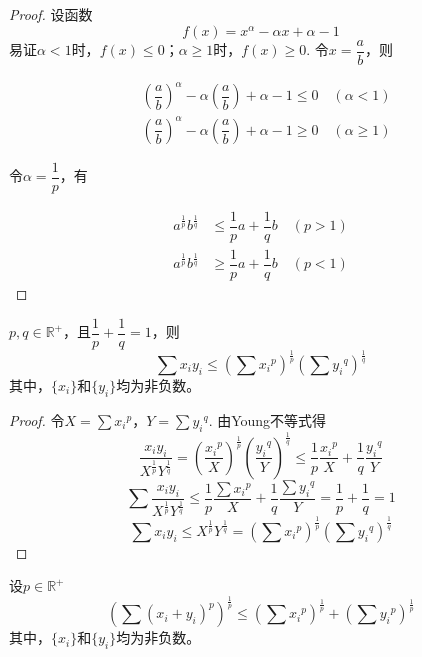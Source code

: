 \begin{proof}

    设函数
    $$f(x) = x^{\alpha} - \alpha x + \alpha - 1$$
    易证$\alpha < 1 $时，$f(x) \leq 0$；$\alpha \geq 1$时，$f(x) \geq 0$.
    令$x=\dfrac{a}{b}$，则
    
    \begin{align*}
        &\left( \dfrac{a}{b} \right)^{\alpha} - \alpha \left( \dfrac{a}{b} \right) + \alpha - 1 \leq 0 \quad (\alpha < 1)\\
        &\left( \dfrac{a}{b} \right)^{\alpha} - \alpha \left( \dfrac{a}{b} \right) + \alpha - 1 \geq 0 \quad (\alpha \geq 1)
    \end{align*}

    令$\alpha = \dfrac{1}{p}$，有

    \begin{align*}
        a^{\frac{1}{p}}b^{\frac{1}{q}}&\leq\dfrac{1}{p}a+\dfrac{1}{q}b\quad(p>1)\\
        a^{\frac{1}{p}}b^{\frac{1}{q}}&\geq\dfrac{1}{p}a+\dfrac{1}{q}b\quad(p<1)
    \end{align*}

\end{proof}

\begin{theorem}[H{\H o}lder不等式]
    
    $p,q\in\mathbb{R}^+$，且$\dfrac{1}{p}+\dfrac{1}{q}=1$，则
    $$\sum{x_i y_i} \leq \left(\sum{{x_i}^{p}}\right)^{\frac{1}{p}} \left(\sum{{y_i}^{q}}\right)^{\frac{1}{q}}$$
    其中，$\{x_i\}$和$\{y_i\}$均为非负数。

\end{theorem}

\begin{proof}

    令$X=\sum{{x_i}^p}$，$Y=\sum{{y_i}^q}$.
    由\textup{Young}不等式得
    $$\dfrac{x_i y_i}{X^{\frac{1}{p}}Y^{\frac{1}{q}}}=\left(\dfrac{{x_i}^p}{X}\right)^{\frac{1}{p}}\left(\dfrac{{y_i}^q}{Y}\right)^{\frac{1}{q}}\leq \dfrac{1}{p}\dfrac{{x_i}^p}{X} + \dfrac{1}{q}\dfrac{{y_i}^q}{Y}$$
    $$\sum{\dfrac{x_i y_i}{X^{\frac{1}{p}}Y^{\frac{1}{q}}}} \leq \dfrac{1}{p}\dfrac{\sum{{x_i}^p}}{X} + \dfrac{1}{q}\dfrac{\sum{{y_i}^q}}{Y} = \dfrac{1}{p}+\dfrac{1}{q}=1 $$
    $$\sum{x_i y_i} \leq X^{\frac{1}{p}} Y^{\frac{1}{q}} = (\sum{{x_i}^{p}})^{\frac{1}{p}} (\sum{{y_i}^{q}})^{\frac{1}{q}}$$

\end{proof}

\begin{theorem}[Minkowski不等式]

    设$p\in\mathbb{R}^+$
    $$\left( \sum{(x_i + y_i)}^p \right) ^{\frac{1}{p}} \leq \left(\sum{{x_i}^p}\right)^{\frac{1}{p}} + \left(\sum{{y_i}^{p}}\right)^{\frac{1}{p}}$$
    其中，$\{x_i\}$和$\{y_i\}$均为非负数。

\end{theorem}

